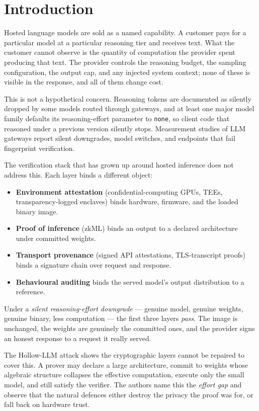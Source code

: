 \documentclass[11pt]{article}
\theoremstyle{definition}
\begin{document}
\section{Introduction}

Hosted language models are sold as a named capability. A customer pays for a
particular model at a particular reasoning tier and receives text. What the
customer cannot observe is the quantity of computation the provider spent
producing that text. The provider controls the reasoning budget, the sampling
configuration, the output cap, and any injected system context; none of these is
visible in the response, and all of them change cost.

This is not a hypothetical concern. Reasoning tokens are documented as silently
dropped by some models routed through gateways, and at least one major model
family defaults its reasoning-effort parameter to \texttt{none}, so client code
that reasoned under a previous version silently stops. Measurement studies of
LLM gateways report silent downgrades, model switches, and endpoints that fail
fingerprint verification.

The verification stack that has grown up around hosted inference does not
address this. Each layer binds a different object:

\begin{itemize}
\item \textbf{Environment attestation} (confidential-computing GPUs, TEEs,
transparency-logged enclaves) binds hardware, firmware, and the loaded binary
image.
\item \textbf{Proof of inference} (zkML) binds an output to a declared
architecture under committed weights.
\item \textbf{Transport provenance} (signed API attestations, TLS-transcript
proofs) binds a signature chain over request and response.
\item \textbf{Behavioural auditing} binds the served model's output
distribution to a reference.
\end{itemize}

\noindent Under a \emph{silent reasoning-effort downgrade} --- genuine model,
genuine weights, genuine binary, less computation --- the first three layers
\emph{pass}. The image is unchanged, the weights are genuinely the committed
ones, and the provider signs an honest response to a request it really served.

The Hollow-LLM attack shows the cryptographic layers cannot be repaired to cover
this. A prover may declare a large architecture, commit to weights whose
algebraic structure collapses the effective computation, execute only the small
model, and still satisfy the verifier. The authors name this the \emph{effort
gap} and observe that the natural defences either destroy the privacy the proof
was for, or fall back on hardware trust.
\end{document}
